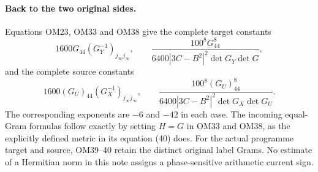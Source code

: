 \documentclass[11pt]{article}
\begin{document}
\paragraph{Back to the two original sides.}
Equations OM23, OM33 and OM38 give the complete target constants
\[
1600G_{44}(G_Y^{-1})_{j_\infty j_\infty},\qquad
\frac{100^8G_{44}^8}
 {6400|3C-B^2|^2\det G_Y\det G},
\tag{OM39}
\]
and the complete source constants
\[
1600(G_U)_{44}(G_X^{-1})_{j_\infty j_\infty},\qquad
\frac{100^8(G_U)_{44}^8}
 {6400|3C-B^2|^2\det G_X\det G_U}.
\tag{OM40}
\]
The corresponding exponents are $-6$ and $-42$ in each case.
The incoming equal-Gram formulas follow exactly by setting
$H=G$ in OM33 and OM38, as the explicitly defined metric in
its equation (40) does.  For the actual programme target and
source, OM39--40 retain the distinct original label Grams.
No estimate of a Hermitian norm in this note assigns a
phase-sensitive arithmetic current sign.
\end{document}
